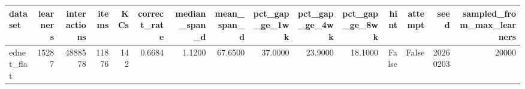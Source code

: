 \begin{tabular}{lrrrrrrrrrrrrrr}
\toprule
dataset & learners & interactions & items & KCs & correct\_rate & median\_span\_d & mean\_span\_d & pct\_gap\_ge\_1wk & pct\_gap\_ge\_4wk & pct\_gap\_ge\_8wk & hint & attempt & seed & sampled\_from\_max\_learners \\
\midrule
ednet\_flat & 15287 & 4888578 & 11876 & 142 & 0.6684 & 1.1200 & 67.6500 & 37.0000 & 23.9000 & 18.1000 & False & False & 20260203 & 20000 \\
\bottomrule
\end{tabular}
